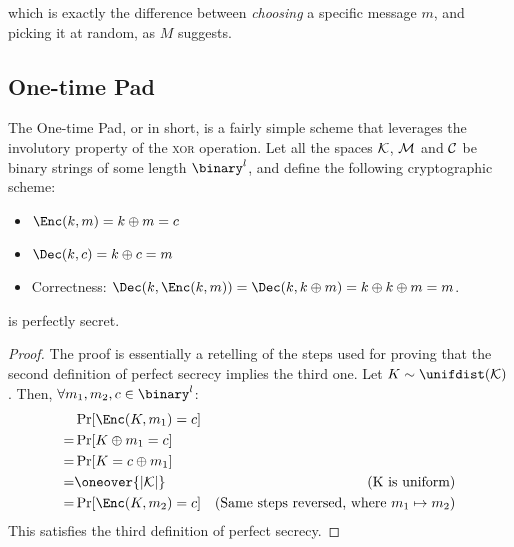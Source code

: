 which is exactly the difference between \emph{choosing} a specific message $m$, and picking it at random, as $M$ suggests.

\subsection{One-time Pad}

The One-time Pad, or \otp{} in short, is a fairly simple scheme that leverages the involutory property of the \textsc{xor} operation. Let all the spaces $\mathcal{K}$, $\mathcal{M}$ and $\mathcal{C}$ be binary strings of some length $\binary^l$, and define the following cryptographic scheme:
\begin{itemize}
    \item $\Enc(k, m) = k \oplus m = c$
    \item $\Dec(k, c) = k \oplus c = m$
    \item Correctness: $\Dec(k, \Enc(k, m)) = \Dec(k, k \oplus m) = k \oplus k \oplus m = m$.
\end{itemize}

\begin{theorem}
    \otp{} is perfectly secret.
\end{theorem}
\begin{proof}
    The proof is essentially a retelling of the steps used for proving that the second definition of perfect secrecy implies the third one. Let $K \sim \unifdist(\K)$. Then, $\forall m_1, m_2, c \in \binary^l$:
    \begin{align*}
        & \Pr[\Enc(K, m_1) = c]     & \\
        =& \Pr[K \oplus m_1 = c]    & \\
        =& \Pr[K = c \oplus m_1]    & \\
        =& \oneover{|\K|}           & \text{(K is uniform)} \\
        =& \Pr[\Enc(K, m_2) = c]    & \text{(Same steps reversed, where $m_1 \mapsto m_2$)} \\  
    \end{align*}
    This satisfies the third definition of perfect secrecy.
\end{proof}


